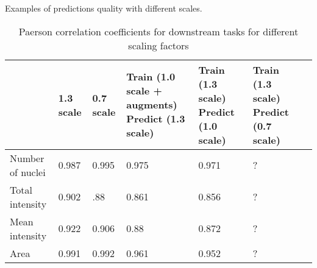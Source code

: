 Examples of predictions quality with different scales.

\begin{table}[H]
    \centering
    \caption{Paerson correlation coefficients for downstream tasks for different scaling factors} 
        \begin{adjustbox}{width=\textwidth}
            \begin{tabular}{|M{35mm}|M{35mm}|M{35mm}|M{35mm}|M{35mm}|M{35mm}|M{35mm}|}\hline
                &1.3 scale&0.7 scale&Train (1.0 scale + augments) \newline Predict (1.3 scale)&Train (1.3 scale) \newline Predict (1.0 scale)&Train (1.3 scale) \newline Predict (0.7 scale)
                \\\hline\hline
                Number of nuclei&0.987&0.995&0.975&0.971&?\\\hline
                Total intensity&0.902&.88&0.861&0.856&?\\\hline
                Mean intensity&0.922&0.906&0.88&0.872&?\\\hline
                Area&0.991&0.992&0.961&0.952&?\\\hline
            \end{tabular}
        \end{adjustbox}
\end{table}
